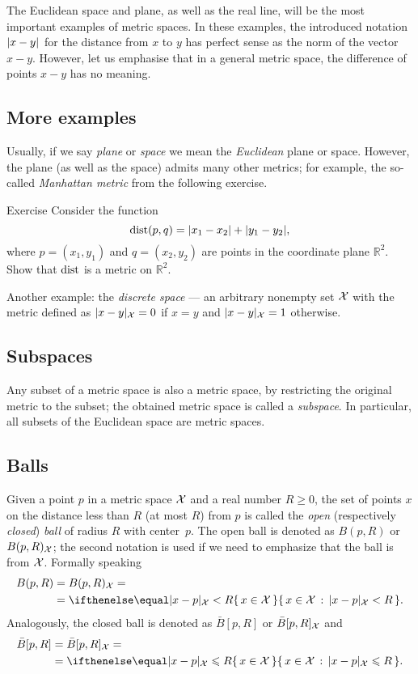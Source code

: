 \begin{multicols}{2}
{The Euclidean space and plane, as well as the real line, will be the most important examples of metric spaces.
In these examples, the introduced notation $\dist{x}{y}{}$ for the distance from $x$ to $y$ has perfect sense as the norm of the vector $x-y$.
However, let us emphasise that in a general metric space, the difference of points $x-y$ has no meaning.

\subsection*{More examples}

Usually, if we say {}\emph{plane} or {}\emph{space} we mean the {}\emph{Euclidean} plane or space.
However, the plane (as well as the space) admits many other metrics; for example, the so-called {}\emph{Manhattan metric} from the following exercise.

\begin{thm}{Exercise}\label{ex:ell-infty}
Consider the function
$$\mathop{\rm dist}\nolimits(p,q)=|x_1-x_2|+|y_1-y_2|,$$
where $p=(x_1,y_1)$ and $q=(x_2,y_2)$ are points in the coordinate plane $\mathbb{R}^2$.
Show that $\mathop{\rm dist}\nolimits$ is a metric on $\mathbb{R}^2$.
\end{thm}

Another example: the {}\emph{discrete space} --- an arbitrary nonempty set $\mathcal{X}$ with the metric defined as $\dist{x}{y}{\spc{X}}=0$ if $x=y$ and $\dist{x}{y}{\spc{X}}=1$ otherwise.

\subsection*{Subspaces}
Any subset of a metric space is also a metric space, by restricting the original metric to the subset;
the obtained metric space is called a {}\emph{subspace}.
In particular, all subsets of the Euclidean space are metric spaces.

\subsection*{Balls}
Given a point $p$ in a metric space $\mathcal{X}$ and a real number $R\ge 0$, the set of points $x$ on the distance less than $R$ (at most $R$) from $p$ is called the \emph{open} (respectively \emph{closed}) {}\emph{ball} of radius $R$ with center~$p$.
The open ball is denoted as $B(p,R)$ or $B(p,R)_{\mathcal{X}}$;
the second notation is used if we need to emphasize that the ball is from $\mathcal{X}$.
Formally speaking
\begin{align*}
B(p,R)&=B(p,R)_{\spc{X}}=
\\
&=\set{x\in \spc{X}}{\dist{x}{p}{\spc{X}}< R}.
\end{align*}
Analogously, the closed ball is denoted as $\bar B[p,R]$ or $\bar B[p,R]_{\mathcal{X}}$ and
\begin{align*}
\bar B[p,R]&=\bar B[p,R]_{\spc{X}}=
\\
&=\set{x\in \spc{X}}{\dist{x}{p}{\spc{X}}\le R}.
\end{align*}

}
\end{multicols}
